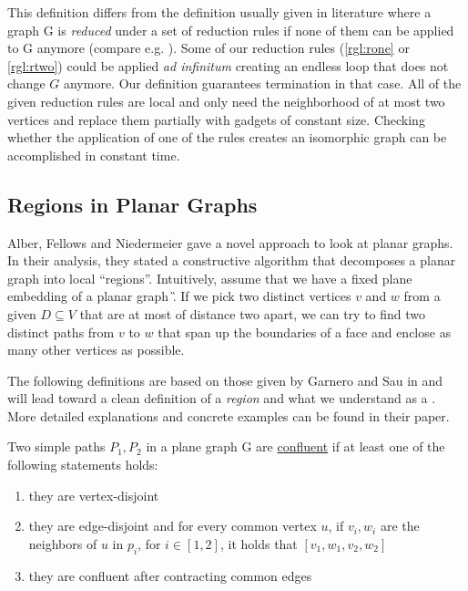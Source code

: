 This definition differs from the definition usually given in literature where a graph G is \textit{reduced} under a set of reduction rules if none of them can be applied to G anymore (compare e.g. \cite{Fomin2019}). Some of our reduction rules (\cref{rgl:rone} or \cref{rgl:rtwo}) could be applied \textit{ad infinitum} creating an endless loop that does not change $G$ anymore. Our definition guarantees termination in that case. All of the given reduction rules are local and only need the neighborhood of at most two vertices and replace them partially with gadgets of constant size. Checking whether the application of one of the rules creates an isomorphic graph can be accomplished in constant time.

\subsection{Regions in Planar Graphs}

Alber, Fellows and Niedermeier \cite{Alber2004} gave a novel approach to look at planar graphs. In their analysis, they stated a constructive algorithm that decomposes a planar graph into local ``regions''. Intuitively, assume that we have a fixed plane embedding of a planar graph \G. If we pick two distinct vertices $v$ and $w$ from a given \sdom $D \subseteq V$ that are at most of distance two apart, we can try to find two distinct paths from $v$ to $w$ that span up the boundaries of a face and enclose as many other vertices as possible. 

The following definitions are based on those given by Garnero and Sau in \cite[arXiv v2]{Garnero2018} and will lead toward a clean definition of a \textit{region} and what we understand as a \dreg. More detailed explanations and concrete examples can be found in their paper.

\begin{definition}
    Two simple paths $P_1, P_2$ in a plane graph G are \underline{confluent} if at least one of the following statements holds:
    
    \begin{enumerate}
        \item they are vertex-disjoint
        \item they are edge-disjoint and for every common vertex $u$, if $v_i, w_i$ are the neighbors of $u$ in $p_i$, for $i \in [1,2]$, it holds that $[v_1, w_1, v_2, w_2]$
        \item they are confluent after contracting common edges
    \end{enumerate}
\end{definition}

